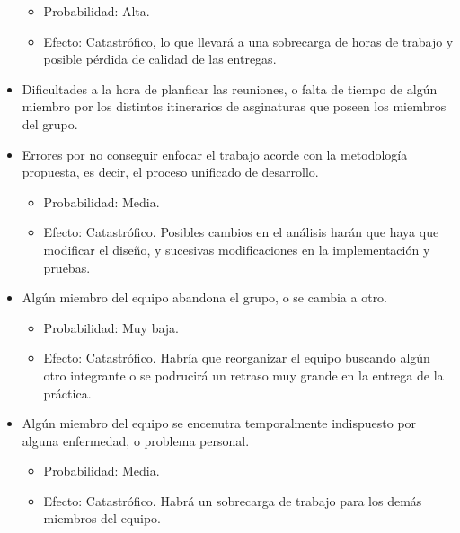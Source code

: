 \begin{itemize}
\begin{itemize}
\item Probabilidad: Alta.

\item Efecto: Catastrófico, lo que llevará a una sobrecarga de horas de trabajo y posible pérdida de calidad de las entregas.

\end{itemize}


\item Dificultades a la hora de planficar las reuniones, o falta de tiempo de algún miembro por los distintos itinerarios de asginaturas que poseen los miembros del grupo.
\item Errores por no conseguir enfocar el trabajo acorde con la metodología propuesta, es decir, el proceso unificado de desarrollo.

\begin{itemize}
\item Probabilidad: Media.

\item Efecto: Catastrófico. Posibles cambios en el análisis harán que haya que modificar el diseño, y sucesivas modificaciones en la implementación y pruebas.

\end{itemize}


\item Algún miembro del equipo abandona el grupo, o se cambia a otro.

\begin{itemize}
\item Probabilidad: Muy baja.

\item Efecto: Catastrófico. Habría que reorganizar el equipo buscando algún otro integrante o se podrucirá un retraso muy grande en la entrega de la práctica.

\end{itemize}


\item Algún miembro del equipo se encenutra temporalmente indispuesto por alguna enfermedad, o problema personal.

\begin{itemize}
\item Probabilidad: Media.

\item Efecto: Catastrófico. Habrá un sobrecarga de trabajo para los demás miembros del equipo.

\end{itemize}



\end{itemize}
